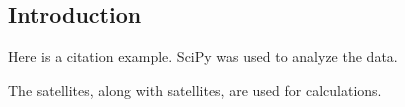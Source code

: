 \cleardoublepage
\vspace*{0.5in}
\setcounter{figure}{0}
\setcounter{table}{0}
\begin{center}
\sectionfont{\Large}
\section{Introduction} 
\label{intro}
\end{center}
\doublespacing
{}
\setcounter{page}{1}
\pagestyle{myheadings}

Here is a citation example. SciPy \citep[see][source page 0]{2020SciPy-NMeth} was used to analyze the data.

The  satellites, along with  satellites, are used for  calculations.